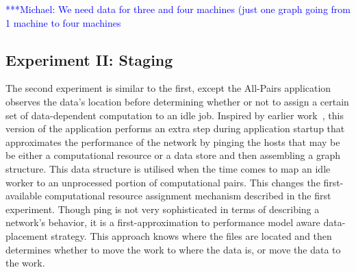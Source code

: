 \documentclass{rspublic}
\newcommand{\micnote}[1]{ {\textcolor{blue} { ***Michael: #1 }}}
\newcommand{\betynote}[1]{ {\textcolor{orange} { ***Bety: #1 }}}
\newcommand{\jhanote}[1]{} \newcommand{\micnote}[1]{}\newcommand{\betynote}[1]{} \newcommand{\fixme}[1]{}
\begin{document}
\jhanote{We need data for compute (comparison) and I/O (only) for
different data-set sizes} \micnote{We need data for three and four
machines (just one graph going from 1 machine to four machines}

\subsection{Experiment II: Staging}
The second experiment is similar to the
first, except the All-Pairs application observes the data's location
before determining whether or not to assign a certain set of
data-dependent computation to an idle job.  Inspired by earlier
work~\citep{netperf}, this version of the application performs an extra
step during application startup that approximates the performance of the
network by pinging the hosts that may be be either a computational
resource or a data store and then  assembling a graph structure.  This
data structure is utilised when the time comes to map an idle worker to
an unprocessed portion of computational pairs.  This changes the
first-available computational resource assignment mechanism described in
the first experiment.  Though ping is not very sophisticated in terms of
describing a network's behavior, it is a first-approximation to
performance model aware data-placement strategy.  This approach knows
where the files are located and then determines whether to move the work
to where the data is, or move the data to the work.  \jhanote{Data-aware
placement is also required, i.e., managing location of files.}  
\end{document}
